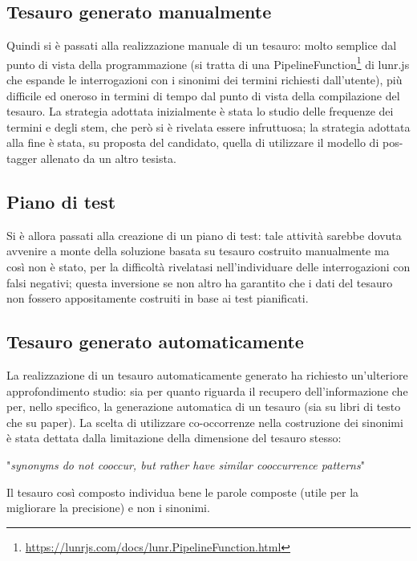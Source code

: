 \subsection{Tesauro generato manualmente}
Quindi si è passati alla realizzazione manuale di un tesauro: molto semplice dal punto di vista della programmazione (si tratta di una PipelineFunction\footnote{\url{https://lunrjs.com/docs/lunr.PipelineFunction.html}} di lunr.js che espande le interrogazioni con i sinonimi dei termini richiesti dall'utente), più difficile ed oneroso in termini di tempo dal punto di vista della compilazione del tesauro.
La strategia adottata inizialmente è stata lo studio delle frequenze dei termini e degli stem, che però si è rivelata essere infruttuosa; la strategia adottata alla fine è stata, su proposta del candidato, quella di utilizzare il modello di \gls{pos-tagger}\glsfirstoccur{} allenato da un altro tesista.

\subsection{Piano di test}
Si è allora passati alla creazione di un piano di test: tale attività sarebbe dovuta avvenire a monte della soluzione basata su tesauro costruito manualmente ma così non è stato, per la difficoltà rivelatasi nell'individuare delle interrogazioni con falsi negativi; questa inversione se non altro ha garantito che i dati del tesauro non fossero appositamente costruiti in base ai test pianificati. 

\subsection{Tesauro generato automaticamente}
La realizzazione di un tesauro automaticamente generato ha richiesto un'ulteriore approfondimento studio: sia per quanto riguarda il recupero dell'informazione che per, nello specifico, la generazione automatica di un tesauro (sia su libri di testo che su paper). La scelta di utilizzare co-occorrenze nella costruzione dei sinonimi è stata dettata dalla limitazione della dimensione del tesauro stesso:

\begin{center}
    "\textit{synonyms do not cooccur, but rather have similar cooccurrence patterns}"
\end{center}

Il tesauro così composto individua bene le parole composte (utile per la migliorare la precisione) e non i sinonimi. 

